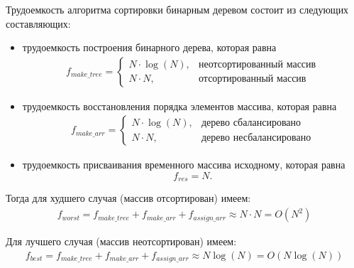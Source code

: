 Трудоемкость алгоритма сортировки бинарным деревом состоит из следующих составляющих:
\begin{itemize}
	\item трудоемкость построения бинарного дерева, которая равна
	\begin{equation}
		\label{сomplexity2:make_tree}
		\begin{gathered}
			f_{make\_tree} =
			\begin{cases}
				N \cdot \log(N), & \text{неотсортированный массив} \\
				N \cdot N, & \text{отсортированный массив}
			\end{cases}
		\end{gathered}  
	\end{equation}
	
	\item трудоемкость восстановления порядка элементов массива, которая равна
	\begin{equation}
	\label{сomplexity2:make_arr}
	\begin{gathered}
		f_{make\_arr} =
		\begin{cases}
			N \cdot \log(N), & \text{дерево сбалансировано} \\
			N \cdot N, & \text{дерево несбалансировано}
		\end{cases}
	\end{gathered}  
	\end{equation}	
	
	\item трудоемкость присваивания временного массива исходному, которая равна
	\begin{equation}
		\label{assign_arr}
		f_{res} = N.
	\end{equation}
	
\end{itemize}

Тогда для худшего случая (массив отсортирован) имеем:
\begin{equation}
	\label{сomplexity:tree_worst}
	\begin{gathered}
		f_{worst} = f_{make\_tree} + f_{make\_arr} + f_{assign\_arr} \approx N \cdot N = O(N^2)
	\end{gathered}
\end{equation}

Для лучшего случая (массив неотсортирован) имеем:
\begin{equation}
	\label{сomplexity:tree_best}
	\begin{gathered}
		f_{best} = f_{make\_tree} + f_{make\_arr} + f_{assign\_arr} \approx N \log(N) = O(N\log(N))
	\end{gathered}
\end{equation}


